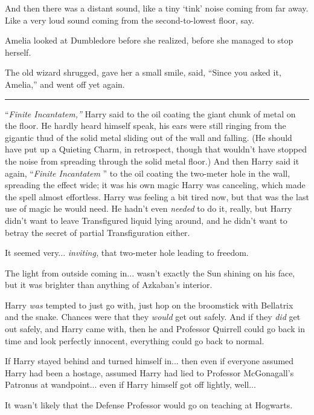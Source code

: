 And then there was a distant sound, like a tiny `tink' noise coming from
far away. Like a very loud sound coming from the second-to-lowest floor,
say.

Amelia looked at Dumbledore before she realized, before she managed to
stop herself.

The old wizard shrugged, gave her a small smile, said, ``Since you asked
it, Amelia,'' and went off yet again.

\begin{center}\rule{3in}{0.4pt}\end{center}

``\emph{Finite Incantatem,''} Harry said to the oil coating the giant
chunk of metal on the floor. He hardly heard himself speak, his ears
were still ringing from the gigantic thud of the solid metal sliding out
of the wall and falling. (He should have put up a Quieting Charm, in
retrospect, though that wouldn't have stopped the noise from spreading
through the solid metal floor.) And then Harry said it again,
``\emph{Finite Incantatem} '' to the oil coating the two-meter hole in the
wall, spreading the effect wide; it was his own magic Harry was
canceling, which made the spell almost effortless. Harry was feeling a
bit tired now, but that was the last use of magic he would need. He
hadn't even \emph{needed} to do it, really, but Harry didn't want to
leave Transfigured liquid lying around, and he didn't want to betray the
secret of partial Transfiguration either.

It seemed very... \emph{inviting,} that two-meter hole leading to
freedom.

The light from outside coming in... wasn't exactly the Sun shining
on his face, but it was brighter than anything of Azkaban's interior.

Harry \emph{was} tempted to just go with, just hop on the broomstick
with Bellatrix and the snake. Chances were that they \emph{would} get
out safely. And if they \emph{did} get out safely, and Harry came with,
then he and Professor Quirrell could go back in time and look perfectly
innocent, everything could go back to normal.

If Harry stayed behind and turned himself in... then even if
everyone assumed Harry had been a hostage, assumed Harry had lied to
Professor McGonagall's Patronus at wandpoint... even if Harry
himself got off lightly, well...

It wasn't likely that the Defense Professor would go on teaching at
Hogwarts.

